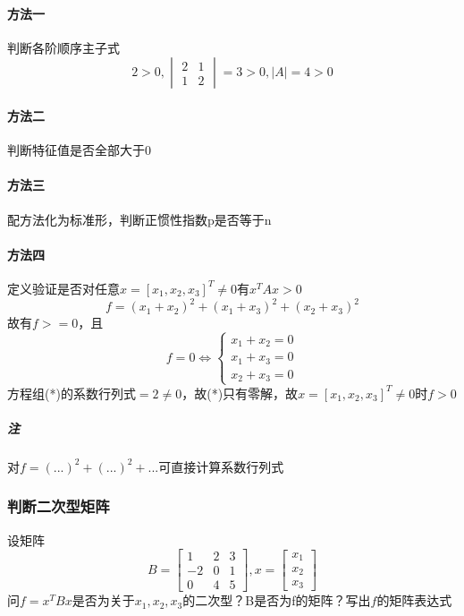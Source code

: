 \paragraph{方法一}
判断各阶顺序主子式\[2 > 0, \begin{vmatrix}
    2 & 1 \\ 
    1 & 2
\end{vmatrix} = 3 > 0, |A| = 4 > 0\]

\paragraph{方法二}
判断特征值是否全部大于0

\paragraph{方法三}
配方法化为标准形，判断正惯性指数p是否等于n

\paragraph{方法四}
定义验证是否对任意\(x = [x_1, x_2, x_3]^T \neq 0\)有\(x^TAx > 0\)\[f = (x_1 + x_2)^2 + (x_1 + x_3)^2 + (x_2 + x_3)^2\]
故有\(f >= 0\)，且\[f = 0 \Leftrightarrow \begin{cases}
    x_1 + x_2 = 0 \\ 
    x_1 + x_3 = 0 \\ 
    x_2 + x_3 = 0
\end{cases}\tag{*}\]
方程组(*)的系数行列式\( = 2 \neq 0\)，故(*)只有零解，故\(x = [x_1, x_2, x_3]^T \neq 0\)时\(f > 0\)

\subparagraph{注}
对\(f = (...)^2 + (...)^2 + ...\)可直接计算系数行列式


\subsubsection{判断二次型矩阵}
设矩阵\[B = \begin{bmatrix}
    1 & 2 & 3 \\ 
    -2 & 0 & 1 \\ 
    0 & 4 & 5
\end{bmatrix}, x = \begin{bmatrix}
    x_1 \\ 
    x_2 \\ 
    x_3
\end{bmatrix}\]问\(f = x^TBx\)是否为关于\(x_1, x_2, x_3\)的二次型？B是否为f的矩阵？写出\(f\)的矩阵表达式

